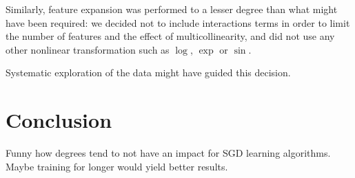 \documentclass[10pt,conference,compsocconf]{IEEEtran}
\begin{document}
Similarly, feature expansion was performed to a lesser degree than
what might have been required: we decided not to include interactions
terms in order to limit the number of features and the effect of
multicollinearity, and did not use any other nonlinear transformation
such as $\log$, $\exp$ or $\sin$.

Systematic exploration of the data might have guided this decision.

\section{Conclusion}
Funny how degrees tend to not have an impact for SGD learning algorithms.
Maybe training for longer would yield better results.




\end{document}
